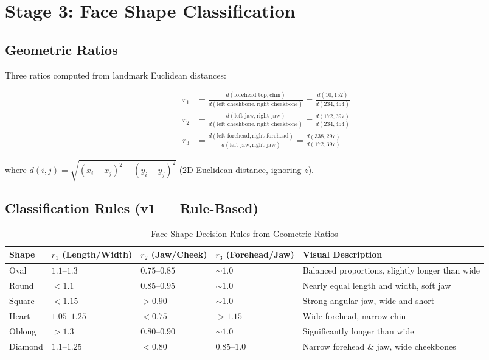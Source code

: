 \documentclass[12pt,a4paper]{article}
\begin{document}
\section{Stage 3: Face Shape Classification}

\subsection{Geometric Ratios}

Three ratios computed from landmark Euclidean distances:

\begin{align}
r_1 &= \frac{d(\text{forehead top}, \text{chin})}{d(\text{left cheekbone}, \text{right cheekbone})} = \frac{d(10, 152)}{d(234, 454)} \label{eq:r1} \\[6pt]
r_2 &= \frac{d(\text{left jaw}, \text{right jaw})}{d(\text{left cheekbone}, \text{right cheekbone})} = \frac{d(172, 397)}{d(234, 454)} \label{eq:r2} \\[6pt]
r_3 &= \frac{d(\text{left forehead}, \text{right forehead})}{d(\text{left jaw}, \text{right jaw})} = \frac{d(338, 297)}{d(172, 397)} \label{eq:r3}
\end{align}

where $d(i, j) = \sqrt{(x_i - x_j)^2 + (y_i - y_j)^2}$ (2D Euclidean distance, ignoring $z$).

\subsection{Classification Rules (v1 --- Rule-Based)}

\begin{table}[H]
\centering
\caption{Face Shape Decision Rules from Geometric Ratios}
\begin{tabular}{@{}l l l l p{4cm}@{}}
\toprule
\textbf{Shape} & $r_1$ (Length/Width) & $r_2$ (Jaw/Cheek) & $r_3$ (Forehead/Jaw) & \textbf{Visual Description} \\
\midrule
Oval & $1.1$--$1.3$ & $0.75$--$0.85$ & $\sim 1.0$ & Balanced proportions, slightly longer than wide \\
Round & $<1.1$ & $0.85$--$0.95$ & $\sim 1.0$ & Nearly equal length and width, soft jaw \\
Square & $<1.15$ & $>0.90$ & $\sim 1.0$ & Strong angular jaw, wide and short \\
Heart & $1.05$--$1.25$ & $<0.75$ & $>1.15$ & Wide forehead, narrow chin \\
Oblong & $>1.3$ & $0.80$--$0.90$ & $\sim 1.0$ & Significantly longer than wide \\
Diamond & $1.1$--$1.25$ & $<0.80$ & $0.85$--$1.0$ & Narrow forehead \& jaw, wide cheekbones \\
\bottomrule
\end{tabular}
\label{tab:face_shape_rules}
\end{table}
\end{document}
